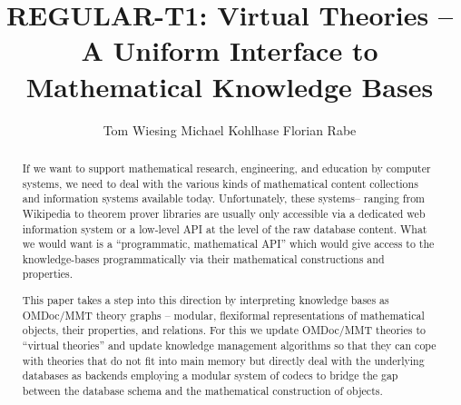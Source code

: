 \documentclass{llncs}
\title{REGULAR-T1: Virtual Theories -- A Uniform Interface to Mathematical Knowledge Bases}
\author{
Tom Wiesing\inst{1}
Michael Kohlhase\inst{1} 
Florian Rabe\inst{2} 
}
\institute{
   FAU Erlangen-N\"urnberg
   \and Jacobs University Bremen
}
\providecommand{\ommt}{\textsf{OMDoc}/\textsf{MMT}\xspace}
\begin{document}
\maketitle
\begin{abstract}
  If we want to support mathematical research, engineering, and education by computer systems, we need to deal with the various kinds of mathematical content collections and information systems available today. Unfortunately, these systems-- ranging from Wikipedia to theorem prover libraries are usually only accessible via a dedicated web information system or a low-level API at the level of the raw database content.  What we would want is a ``programmatic, mathematical API'' which would give access to the knowledge-bases programmatically via their mathematical constructions and properties.

  This paper takes a step into this direction by interpreting knowledge bases as \ommt theory graphs -- modular, flexiformal representations of mathematical objects, their properties, and relations. 
  For this we update \ommt theories to ``virtual theories'' and update knowledge management algorithms so that they can cope with theories that do not fit into main memory but directly deal with the underlying databases as backends employing a modular system of codecs to bridge the gap between the database schema and the mathematical construction of objects.
\end{abstract}






\printbibliography
\end{document}
